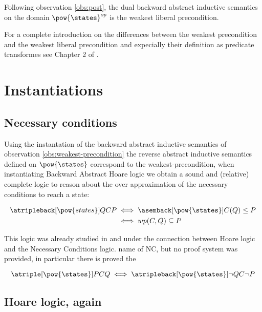 \begin{observation}
  \label{obs:weakest-liberal-precondition}
  Following observation \ref{obs:post}, the dual backward 
  abstract inductive semantics on the domain $\pow{\states}^{op}$ is the weakest 
  liberal precondition.
\end{observation}

For a complete introduction on the differences between the weakest precondition
and the weakest liberal precondition and expecially their definition as
predicate transformes see Chapter 2 of \cite{Kaminski19}.

\section{Instantiations}

\subsection{Necessary conditions}

Using the instantation of the backward abstract inductive semantics of 
observation \ref{obs:weakest-precondition} the reverse abstract inductive semantics
defined on $\pow{\states}$ correspond to the weakest-precondition, when 
instantiating Backward Abstract Hoare logic we obtain a sound and (relative) 
complete logic to reason about the over approximation of the necessary 
conditions to reach a state:

\begin{align*}
  \atripleback[\pow{states}]{Q}{C}{P} 
    & \iff \asemback[\pow{\states}]{C}(Q) \leq P \\
    & \iff wp(C, Q) \subseteq P
\end{align*}

This logic was already studied in \cite{Zhang22} and \cite{Ascari24} under the 
connection between Hoare logic and the Necessary Conditions logic.
name of NC, but no proof system was provided, in particular there is proved the 

\begin{theorem}
  $$\atriple[\pow{\states}]{P}{C}{Q} \iff \atripleback[\pow{\states}]{\neg Q}{C}
  {\neg P}$$
\end{theorem}

\subsection{Hoare logic, again}

